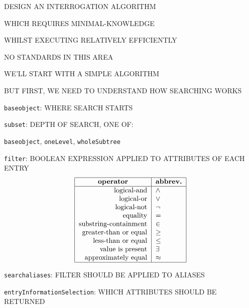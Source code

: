 \begin{bwslide}

\begin{nrtc}
\item	DESIGN AN INTERROGATION ALGORITHM
    \begin{nrtc}
    \item	WHICH REQUIRES MINIMAL-KNOWLEDGE

    \item	WHILST EXECUTING RELATIVELY EFFICIENTLY
    \end{nrtc}

\item	NO STANDARDS IN THIS AREA

\item	WE'LL START WITH A SIMPLE ALGORITHM

\item	BUT FIRST, WE NEED TO UNDERSTAND HOW SEARCHING WORKS
\end{nrtc}
\end{bwslide}


\begin{bwslide}

\begin{nrtc}
\item \verb"baseobject": WHERE SEARCH STARTS

\item \verb"subset": DEPTH OF SEARCH, ONE OF:
    \begin{nrtc}
    \item	\verb"baseobject", \verb"oneLevel", \verb"wholeSubtree"
    \end{nrtc}

\item \verb"filter": BOOLEAN EXPRESSION APPLIED TO ATTRIBUTES OF EACH ENTRY
\[\begin{tabular}{|r|l|}
\hline
\multicolumn{1}{|c|}{\bf operator}&
			\multicolumn{1}{c|}{\bf abbrev.}\\
\hline
logical-and&		$\land$\\
logical-or&		$\lor$\\
logical-not&		$\lnot$\\
equality&		$=$\\
substring-containment&	$\in$\\
greater-than or equal&	$\geq$\\
less-than or equal&	$\leq$\\
value is present&	$\exists$\\
approximately equal&	$\approx$\\
\hline
\end{tabular}\]

\item \verb"searchaliases": FILTER SHOULD BE APPLIED TO ALIASES

\item	\verb"entryInformationSelection": WHICH ATTRIBUTES SHOULD BE RETURNED
\end{nrtc}
\end{bwslide}


